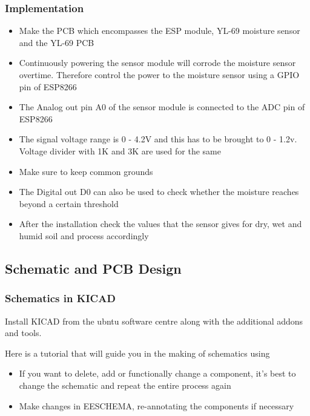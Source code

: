\documentclass[16pt]{article}
\begin{document}
\subsubsection{Implementation}

\begin{itemize}

\item
  Make the PCB which encompasses the ESP module, YL-69 moisture sensor
  and the YL-69 PCB
\item
  Continuously powering the sensor module will corrode the moisture
  sensor overtime. Therefore control the power to the moisture sensor
  using a GPIO pin of ESP8266
\item
  The Analog out pin A0 of the sensor module is connected to the ADC pin
  of ESP8266
\item
  The signal voltage range is 0 - 4.2V and this has to be brought to 0 -
  1.2v. Voltage divider with 1K and 3K are used for the same
\item
  Make sure to keep common grounds
\item
  The Digital out D0 can also be used to check whether the moisture
  reaches beyond a certain threshold
\item
  After the installation check the values that the sensor gives for dry,
  wet and humid soil and process accordingly
\end{itemize}

\vspace{0.5cm}

\subsection{Schematic and PCB
Design}



\subsubsection{Schematics in KICAD}
Install KICAD from the ubntu software centre along with the additional
addons and tools.

Here is a tutorial that will guide you in the making of schematics using

\begin{itemize}

\item
  If you want to delete, add or functionally change a component, it's
  best to change the schematic and repeat the entire process again
\item
  Make changes in EESCHEMA, re-annotating the components if necessary
  \vspace{0.2cm}
\end{itemize}
\end{document}
